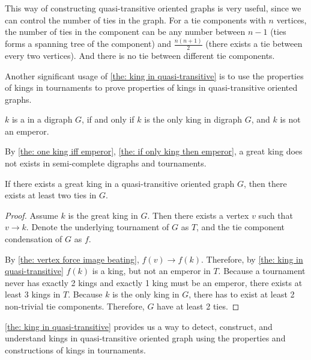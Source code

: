 This way of constructing quasi-transitive oriented graphs
is very useful,
since we can control the number of ties in the graph.
For a tie components with \(n\) vertices,
the number of ties in the component can be any number
between \(n - 1\)
(ties forms a spanning tree of the component)
and \(\frac{n(n+1)}{2}\)
(there exists a tie between every two vertices).
And there is no tie between different tie components.

Another significant usage of \cref{the: king in quasi-transitive}
is to use the properties of kings in tournaments to prove
properties of kings in quasi-transitive oriented graphs.

\begin{definition}
  \(k\) is a  in a digraph \(G\),
  if and only if \(k\) is the only king in digraph \(G\),
  and \(k\) is not an emperor.
\end{definition}

By \cref{the: one king iff emperor},
\cref{the: if only king then emperor},
a great king does not exists in semi-complete digraphs and
tournaments.

\begin{corollary}
  If there exists a great king in a
  quasi-transitive oriented graph \(G\),
  then there exists at least two ties in \(G\).
\end{corollary}

\begin{proof}
  Assume \(k\) is the great king in \(G\).
  Then there exists a vertex  \(v\) such that \(v \to k\).
  Denote the underlying tournament of \(G\) as \(T\),
  and the tie component condensation of \(G\) as \(f\).

  By \cref{the: vertex force image beating}, \(f(v) \to f(k)\).
  Therefore, by \cref{the: king in quasi-transitive}
  \(f(k)\) is a king, but not an emperor in \(T\).
  Because a tournament never has exactly 2 kings
  and exactly 1 king must be an emperor,
  there exists at least 3 kings in \(T\).
  Because \(k\) is the only king in \(G\),
  there has to exist at least 2 non-trivial tie components.
  Therefore, \(G\) have at least 2 ties.
\end{proof}

\cref{the: king in quasi-transitive}
provides us a way to detect, construct, and understand kings
in quasi-transitive oriented graph using
the properties and constructions of kings in tournaments.
